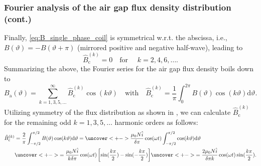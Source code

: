 \begin{frame}
	\frametitle{Fourier analysis of the air gap flux density distribution (cont.)}
	\onslide<+-> Finally, \eqref{eq:B_single_phase_coil} is symmetrical w.r.t. the abscissa, i.e., $B(\vartheta)=-B(\vartheta+\pi)$ (mirrored positive and negative half-wave), leading to
	$$\hat{B}_{\mathrm{c}}^{(k)} = 0 \quad \mbox{for } \quad k=2,4,6,\ldots .$$ \onslide<+->
	Summarizing the above, the Fourier series for the air gap flux density boils down to
	\begin{equation}
		B_\mathrm{a}(\vartheta) = \sum_{k=1,3,5,\ldots}^{\infty} \hat{B}_{\mathrm{c}}^{(k)} \cos(k \vartheta) \quad \mbox{with} \quad \hat{B}_{\mathrm{c}}^{(k)} = \frac{1}{\pi} \int_{0}^{2 \pi} B(\vartheta) \cos(k \vartheta) \mathrm{d}\vartheta.
		\label{eq:fourier_series_B_single_phase_coil_reduced}
	\end{equation} \onslide<+->
	Utilizing symmetry of the flux distribution as shown in , we can calculate $\hat{B}_{\mathrm{c}}^{(k)}$ for the remaining odd $k=1,3,5,\ldots$ harmonic orders as follows:
	\begin{equation}
		\begin{split}
			\hat{B}_{\mathrm{c}}^{(k)} & = \frac{2}{\pi} \int_{-\pi/2}^{\pi/2} B(\vartheta) \cos(k \vartheta) \mathrm{d}\vartheta =  \uncover<+->{\frac{\mu_0 N \hat{i}}{\delta \pi } \cos(\omega t) \int_{-\pi/2}^{\pi/2} \cos(k \vartheta) \mathrm{d}\vartheta} \\ &\uncover<+->{= \frac{\mu_0 N \hat{i}}{k \delta \pi } \cos(\omega t) \left[ \sin(\frac{k \pi}{2}) - \sin(-\frac{k \pi}{2}) \right]}\uncover<+->{= \frac{2 \mu_0 N \hat{i}}{\delta \pi k} \cos(\omega t) \sin(\frac{k \pi}{2}).}
		\end{split}
		\label{eq:B_single_phase_coil_fourier_series_coefficients}
	\end{equation}
\end{frame}

